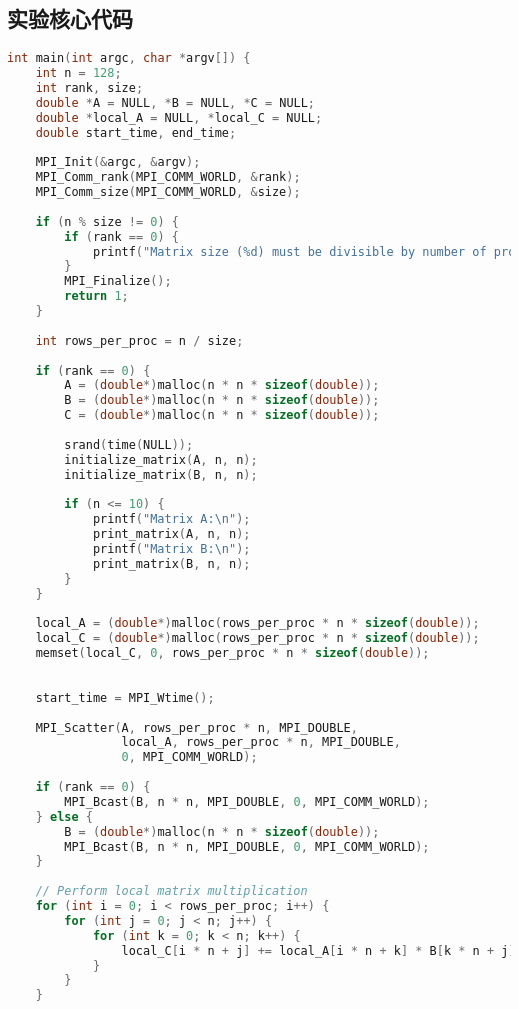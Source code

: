 \documentclass{SYSUReport}
\begin{document}
\subsection{实验核心代码}
% 
\begin{lstlisting}[language=C]
int main(int argc, char *argv[]) {
    int n = 128;
    int rank, size;
    double *A = NULL, *B = NULL, *C = NULL;
    double *local_A = NULL, *local_C = NULL;
    double start_time, end_time;
        
    MPI_Init(&argc, &argv);
    MPI_Comm_rank(MPI_COMM_WORLD, &rank);
    MPI_Comm_size(MPI_COMM_WORLD, &size);
        
    if (n % size != 0) {
        if (rank == 0) {
            printf("Matrix size (%d) must be divisible by number of processes (%d)\n", n, size);
        }
        MPI_Finalize();
        return 1;
    }
        
    int rows_per_proc = n / size;
        
    if (rank == 0) {
        A = (double*)malloc(n * n * sizeof(double));
        B = (double*)malloc(n * n * sizeof(double));
        C = (double*)malloc(n * n * sizeof(double));
            
        srand(time(NULL));
        initialize_matrix(A, n, n);
        initialize_matrix(B, n, n);
            
        if (n <= 10) {
            printf("Matrix A:\n");
            print_matrix(A, n, n);
            printf("Matrix B:\n");
            print_matrix(B, n, n);
        }
    }
    
    local_A = (double*)malloc(rows_per_proc * n * sizeof(double));
    local_C = (double*)malloc(rows_per_proc * n * sizeof(double));
    memset(local_C, 0, rows_per_proc * n * sizeof(double));
    
        
    start_time = MPI_Wtime();
        
    MPI_Scatter(A, rows_per_proc * n, MPI_DOUBLE, 
                local_A, rows_per_proc * n, MPI_DOUBLE, 
                0, MPI_COMM_WORLD);
        
    if (rank == 0) {
        MPI_Bcast(B, n * n, MPI_DOUBLE, 0, MPI_COMM_WORLD);
    } else {
        B = (double*)malloc(n * n * sizeof(double));
        MPI_Bcast(B, n * n, MPI_DOUBLE, 0, MPI_COMM_WORLD);
    }
        
    // Perform local matrix multiplication
    for (int i = 0; i < rows_per_proc; i++) {
        for (int j = 0; j < n; j++) {
            for (int k = 0; k < n; k++) {
                local_C[i * n + j] += local_A[i * n + k] * B[k * n + j];
            }
        }
    }
        

\end{lstlisting}
\end{document}
